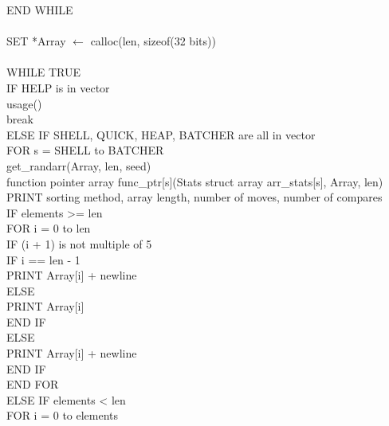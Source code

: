 \documentclass[12pt]{article}
\begin{document}
\indent END WHILE \\
\\
\indent SET *Array $\leftarrow$ calloc(len, sizeof(32 bits)) \\
\\
\indent WHILE TRUE \\
\indent \indent IF HELP is in vector \\
\indent \indent \indent usage() \\
\indent \indent \indent break \\
\indent \indent ELSE IF SHELL, QUICK, HEAP, BATCHER are all in vector \\
\indent \indent \indent FOR s = SHELL to BATCHER \\
\indent \indent \indent \indent get\_randarr(Array, len, seed) \\
\indent \indent \indent \indent function pointer array func\_ptr[s](Stats struct array arr\_stats[s], Array, len) \\
\indent \indent \indent \indent PRINT sorting method, array length, number of moves, number of compares \\
\indent \indent \indent \indent IF elements >= len \\
\indent \indent \indent \indent \indent FOR i = 0 to len \\
\indent \indent \indent \indent \indent \indent IF (i + 1) is not multiple of 5 \\
\indent \indent \indent \indent \indent \indent \indent IF i == len - 1 \\
\indent \indent \indent \indent \indent \indent \indent \indent PRINT Array[i] + newline \\
\indent \indent \indent \indent \indent \indent \indent ELSE \\
\indent \indent \indent \indent \indent \indent \indent \indent PRINT Array[i] \\
\indent \indent \indent \indent \indent \indent \indent END IF \\
\indent \indent \indent \indent \indent \indent ELSE \\
\indent \indent \indent \indent \indent \indent \indent PRINT Array[i] + newline \\
\indent \indent \indent \indent \indent \indent END IF \\
\indent \indent \indent \indent \indent END FOR \\
\indent \indent \indent \indent ELSE IF elements < len \\
\indent \indent \indent \indent \indent FOR i = 0 to elements \\
\end{document}
